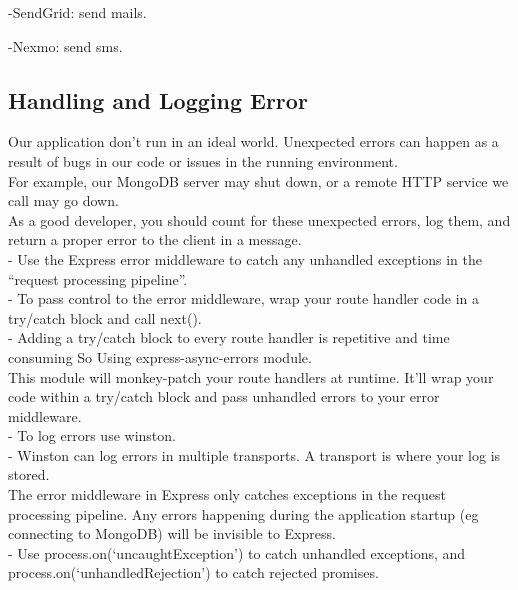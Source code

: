 -SendGrid: send mails.

-Nexmo: send sms.



\subsection{ Handling and Logging Error}
\hspace{2cm}Our application don’t run in an ideal world. Unexpected errors can happen as a result of bugs in our code or issues in the running environment.\\
For example, our MongoDB server may shut down, or a remote HTTP service we call may go down.\\
As a good developer, you should count for these unexpected errors, log them, and return a proper error to the client in a message.\\
- Use the Express error middleware to catch any unhandled exceptions in the “request processing pipeline”.\\
- To pass control to the error middleware, wrap your route handler code in a try/catch block and call next().\\
- Adding a try/catch block to every route handler is repetitive and time consuming So Using express-async-errors module.\\
This module will monkey-patch your route handlers at runtime. It’ll wrap your code within a try/catch block and pass unhandled errors to your error middleware.\\
- To log errors use winston.\\
- Winston can log errors in multiple transports. A transport is where your log is stored.\\
The error middleware in Express only catches exceptions in the request
processing pipeline. Any errors happening during the application startup (eg connecting to MongoDB) will be invisible to Express.\\
- Use process.on(‘uncaughtException’) to catch unhandled exceptions, and
process.on(‘unhandledRejection’) to catch rejected promises.\cite{AF1}



















 
 